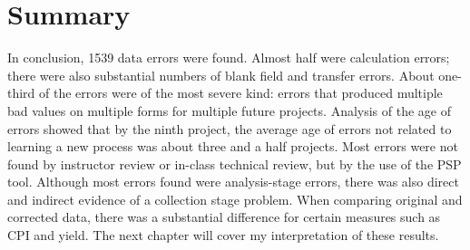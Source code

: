 \section{Summary}
In conclusion, 1539 data errors were found.  Almost half were calculation
errors; there were also substantial numbers of blank field and transfer
errors.  About one-third of the errors were of the most severe kind:
errors that produced multiple bad values on multiple forms for multiple
future projects.  Analysis of the age of errors showed that by the ninth
project, the average age of errors not related to learning a new process
was about three and a half projects.  Most errors were not found by
instructor review or in-class technical review, but by the use of the PSP
tool.  Although most errors found were analysis-stage errors, there was
also direct and indirect evidence of a collection stage problem.  When
comparing original and corrected data, there was a substantial difference
for certain measures such as CPI and yield.  The next chapter will cover my 
interpretation of these results.



